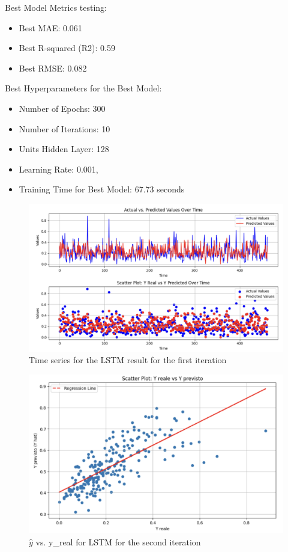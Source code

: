 \documentclass[10pt]{article} %
\begin{document}
    Best Model Metrics testing:
    \begin{itemize}
        \item Best MAE: 0.061
        \item Best R-squared (R2): 0.59
        \item Best RMSE: 0.082
    \end{itemize}

Best Hyperparameters for the Best Model:

    \begin{itemize}
        \item Number of Epochs: 300
        \item Number of Iterations: 10
        \item Units Hidden Layer: 128
        \item Learning Rate: 0.001,
        \item Training Time for Best Model:  67.73 seconds
    \end{itemize}

    \begin{figure}
        \centering
        \includegraphics[scale=0.4]{Assets/iteration 1/lstm_it1_1.png}
        \caption{Time series for the LSTM result for the first iteration}
        \label{fig:enter-label}
    \end{figure}

    \begin{figure}
        \centering
        \includegraphics[scale=0.4]{Assets/iteration 1/lstm_it1_2.png}
        \caption{$\hat{y}$ vs. y\_real for LSTM for the second iteration}
        \label{fig:enter-label}
    \end{figure}
    \newpage
\end{document}
